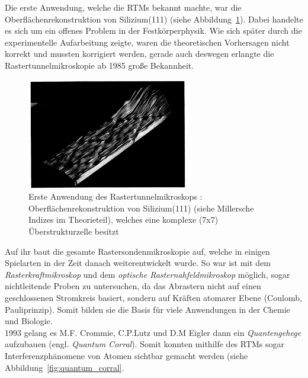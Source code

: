 Die erste Anwendung, welche die RTMs bekannt
machte, war die Oberflächenrekonstruktion von Silizium(111)  
\cite{binnig1983111} (siehe Abbildung~\ref{fig:silicium}).
Dabei handelte es sich um ein offenes Problem in der
Festkörperphysik. Wie sich später durch die experimentelle
Aufarbeitung zeigte, waren die theoretischen Vorhersagen nicht 
korrekt und mussten korrigiert werden, gerade auch deswegen
erlangte die Rastertunnelmikroskopie ab 1985 große Bekannheit.
\begin{figure}
\includegraphics[width=7cm]{pics/silicium}
\caption{Erste Anwendung des Rastertunnelmikroskops 
\cite{binnig1983111}: 
Oberflächenrekonstruktion von Silizium(111) (siehe Millersche
Indizes im Theorieteil), welches eine komplexe (7x7) 
Überstrukturzelle besitzt}
 \label{fig:silicium}
\end{figure}

Auf ihr baut die gesamte Rastersondenmikroskopie auf, welche
in einigen Spielarten in der Zeit danach weiterentwickelt wurde.
So war ist mit dem \textit{Rasterkraftmikroskop}
und dem \textit{optische Rasternahfeldmikroskop} möglich, sogar
nichtleitende Proben zu untersuchen, da das Abrastern nicht auf
einen geschlossenen Stromkreis basiert, sondern auf Kräften 
atomarer Ebene (Coulomb, Pauliprinzip). Somit bilden sie die Basis
für viele Anwendungen in der Chemie und Biologie.\\
1993 gelang es M.F. Crommie, C.P.Lutz und
D.M Eigler \cite{crommie1993imaging} dann
ein \textit{Quantengehege} aufzubauen
(engl. \textit{Quantum Corral}). Somit konnten mithilfe
des RTMs sogar Interferenzphänomene von Atomen
sichtbar gemacht werden (siehe Abbildung~\ref{fig:quantum_corral}. 

